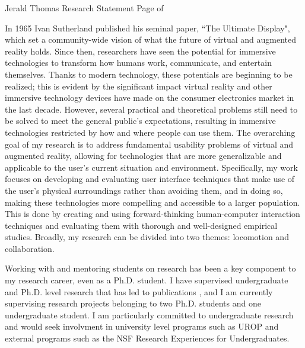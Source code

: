\newpage

\setcounter{page}{1}
\makecvfooter
  {Jerald Thomas}
  {Research Statement}
  {Page \thepage \hspace{1pt} of \pageref{research_last}}


\makecvheader[C]
\doublespacing


In 1965 Ivan Sutherland published his seminal paper, ``The Ultimate Display", which set a community-wide vision of what the future of virtual and augmented reality holds. Since then, researchers have seen the potential for immersive technologies to transform how humans work, communicate, and entertain themselves. Thanks to modern technology, these potentials are beginning to be realized; this is evident by the significant impact virtual reality and other immersive technology devices have made on the consumer electronics market in the last decade. However, several practical and theoretical problems still need to be solved to meet the general public’s expectations, resulting in immersive technologies restricted by how and where people can use them. The overarching goal of my research is to address fundamental usability problems of virtual and augmented reality, allowing for technologies that are more generalizable and applicable to the user's current situation and environment. Specifically, my work focuses on developing and evaluating user interface techniques that make use of the user's physical surroundings rather than avoiding them, and in doing so, making these technologies more compelling and accessible to a larger population. This is done by creating and using forward-thinking human-computer interaction techniques and evaluating them with thorough and well-designed empirical studies. Broadly, my research can be divided into two themes: locomotion and collaboration.

Working with and mentoring students on research has been a key component to my research career, even as a Ph.D. student. I have supervised undergraduate and Ph.D. level research that has led to publications \cite{you2019strafing, adeniyi2021red, you2022strafing}, and I am currently supervising research projects belonging to two Ph.D. students and one undergraduate student. I am particularly committed to undergraduate research and would seek involvment in university level programs such as UROP and external programs such as the NSF Research Experiences for Undergraduates.

